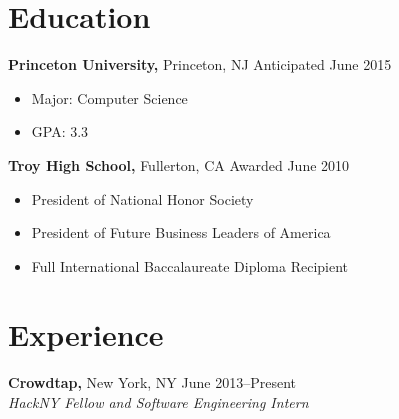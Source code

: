 \documentclass[margin]{res}
\begin{document}

\address{{\bf Present Address} \\ 3169 Frist Center \\
  Princeton, NJ 08544 \\ dan@dskang.com \\ http://dskang.com }

\address{{\bf Permanent Address} \\ 2507 Cypress Point Drive \\
  Fullerton, CA 92833 }


\begin{resume}

\section{Education}
 {\bf Princeton University,} Princeton, NJ \hfill Anticipated June
 2015
 \begin{itemize} \itemsep -2pt %
 \item Major: Computer Science
 \item GPA: 3.3
 \end{itemize}

 {\bf Troy High School,} Fullerton, CA \hfill Awarded June 2010
 \begin{itemize} \itemsep -2pt %
 \item President of National Honor Society
 \item President of Future Business Leaders of America
 \item Full International Baccalaureate Diploma Recipient
 \end{itemize}

\section{Experience}
 {\bf Crowdtap,} New York, NY \hfill June 2013--Present \\
 {\it HackNY Fellow and Software Engineering Intern}



\end{resume}
\end{document}

